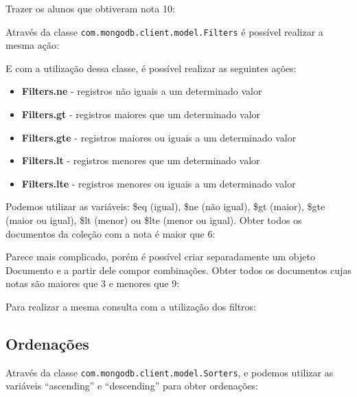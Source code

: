 \documentclass[a4paper,11pt]{article}
\begin{document}
Trazer os alunos que obtiveram nota 10: \\

Através da classe \texttt{com.mongodb.client.model.Filters} é possível realizar a mesma ação: \\

E com a utilização dessa classe, é possível realizar as seguintes ações:
\begin{itemize}[nolistsep]
  \item \textbf{Filters.ne} - registros não iguais a um determinado valor
  \item \textbf{Filters.gt} - registros maiores que um determinado valor
  \item \textbf{Filters.gte} - registros maiores ou iguais a um determinado valor
  \item \textbf{Filters.lt} - registros menores que um determinado valor
  \item \textbf{Filters.lte} - registros menores ou iguais a um determinado valor
\end{itemize}

Podemos utilizar as variáveis: \$eq (igual), \$ne (não igual), \$gt (maior), \$gte (maior ou igual), \$lt (menor) ou \$lte (menor ou igual). Obter todos os documentos da coleção com a nota é maior que 6: \\

Parece mais complicado, porém é possível criar separadamente um objeto Documento e a partir dele compor combinações. Obter todos os documentos cujas notas são maiores que 3 e menores que 9: \\

Para realizar a mesma consulta com a utilização dos filtros: \\

\subsection{Ordenações}
Através da classe \texttt{com.mongodb.client.model.Sorters}, e podemos utilizar as variáveis ``ascending'' e ``descending'' para obter ordenações: \\
\end{document}
